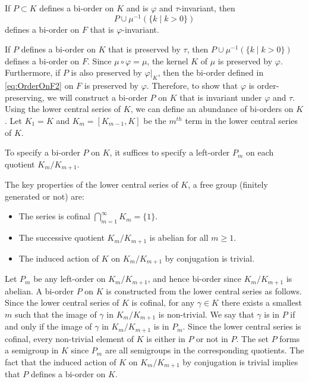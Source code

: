 \documentclass{amsart}
\makeatletter
\renewenvironment{proof}[1][\proofname]{%
   \par\pushQED{\qed}\normalfont%
   \topsep6\p@\@plus6\p@\relax
   \trivlist\item[\hskip\labelsep\bfseries#1\@addpunct{.}]%
   \ignorespaces
}{%
   \popQED\endtrivlist\@endpefalse
}
\makeatother
\begin{document}
\begin{fact}
\label{fact:ConstructingBiOrdersOnFGFreeGroup}
    If $P \subset K$ defines a bi-order on $K$ and is $\varphi$ and $\tau$-invariant, then
    \begin{equation}
        \label{eq:OrderOnF2}
        P \cup \mu^{-1}(\{k \mid k >0\})
    \end{equation}
defines a bi-order on $F$ that is $\varphi$-invariant. 
\end{fact}

\begin{proof}
If $P$ defines a bi-order on $K$ that is preserved by $\tau$, then $P \cup \mu^{-1}(\{k \mid k >0\})$
defines a bi-order on $F$. Since $\mu\circ\varphi = \mu$, the kernel $K$ of $\mu$ is preserved by $\varphi$. Furthermore, if $P$ is also preserved by $\varphi|_K$, then the bi-order defined in \cref{eq:OrderOnF2} on $F$ is preserved by $\varphi$.
\end{proof}
Therefore, to show that $\varphi$ is order-preserving, we will construct a bi-order $P$ on $K$ that is invariant under $\varphi$ and $\tau$.
Using the lower central series of $K$, we can define an abundance of bi-orders on $K$. Let $K_1 = K$ and $K_m =[K_{m-1},K]$ be the $m^{th}$ term in the lower central series of $K$.

\begin{fact}
\label{fact:ConstructingStandardOrderOnFreeGroup}
    To specify a bi-order $P$ on $K$, it suffices to specify a left-order $P_m$ on each quotient $K_m/K_{m+1}$. 
\end{fact}

\begin{proof}
The key properties of the lower central series of $K$, a free group (finitely generated or not) are:
\begin{itemize}
    \item The series is cofinal $\displaystyle\bigcap_{m=1}^\infty K_m = \{1\}$.
    \item The successive quotient $K_m/K_{m+1}$ is abelian for all $m \geq 1$.
    \item The induced action of $K$ on $K_m/K_{m+1}$ by conjugation is trivial. 
\end{itemize}
Let $P_m$ be any left-order on $K_m/K_{m+1}$, and hence bi-order since $K_m/K_{m+1}$ is abelian. A bi-order $P$ on $K$ is constructed from the lower central series as follows. Since the lower central series of $K$ is cofinal, for any $\gamma \in K$ there exists a smallest $m$ such that the image of $\gamma$ in $K_{m}/K_{m+1}$ is non-trivial. We say that $\gamma$ is in $P$ if and only if the image of $\gamma$ in $K_{m}/K_{m+1}$ is in $P_m$. Since the lower central series is cofinal, every non-trivial element of $K$ is either in $P$ or not in $P$. The set $P$ forms a semigroup in $K$ since $P_m$ are all semigroups in the corresponding quotients. The fact that the induced action of $K$ on $K_m/K_{m+1}$ by conjugation is trivial implies that $P$ defines a bi-order on $K$.
\end{proof}
\end{document}

